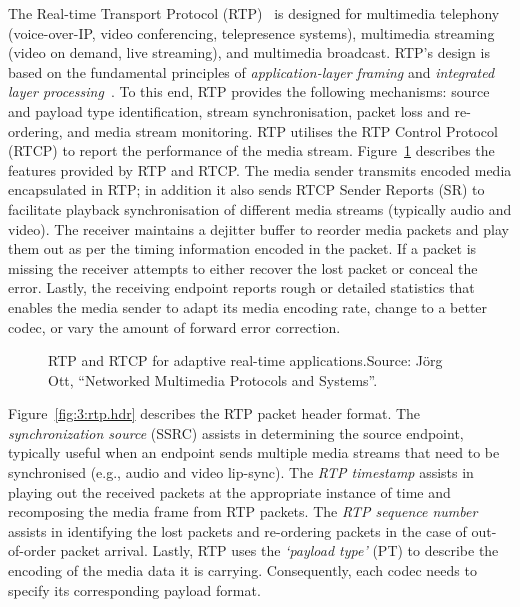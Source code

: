 
The Real-time Transport Protocol (RTP)~\cite{rfc3550} is designed for
multimedia telephony (voice-over-IP, video conferencing, telepresence
systems), multimedia streaming (video on demand, live streaming), and
multimedia broadcast. RTP's design is based on the fundamental principles of
\textit {application-layer framing} and \textit{integrated layer
processing}~\cite{clark:alf}. To this end, RTP provides the following
mechanisms: source and payload type identification, stream synchronisation,
packet loss and re-ordering, and media stream monitoring. RTP utilises the RTP
Control Protocol (RTCP) to report the performance of the media stream.
Figure~\ref{fig:3:rtp:model} describes the features provided by RTP and RTCP.
The media sender transmits encoded media encapsulated in RTP; in addition it
also sends RTCP Sender Reports (SR) to facilitate playback synchronisation of
different media streams (typically audio and video). The receiver maintains a
dejitter buffer to reorder media packets and play them out as per the timing
information encoded in the packet. If a packet is missing the receiver attempts
to either recover the lost packet or conceal the error. Lastly, the receiving
endpoint reports rough or detailed statistics that enables the media sender to
adapt its media encoding rate, change to a better codec, or vary the amount of
forward error correction.

\begin{figure}[!t]
\caption{RTP and RTCP for adaptive real-time applications.{\scriptsize Source:
J\"org Ott, ``Networked Multimedia Protocols and Systems''}.}
\label{fig:3:rtp:model}
\end{figure}

Figure~\ref{fig:3:rtp.hdr} describes the RTP packet header format. The
\textit{synchronization source} (SSRC) assists in determining the source
endpoint, typically useful when an endpoint sends multiple media streams that
need to be synchronised (e.g., audio and video lip-sync). The \textit{RTP
timestamp} assists in playing out the received packets at the appropriate
instance of time and recomposing the media frame from RTP packets. The
\textit{RTP sequence number} assists in identifying the lost packets and 
re-ordering packets in the case of out-of-order packet arrival. Lastly, RTP uses
the \textit{`payload type'} (PT) to describe the encoding of the media data it is
carrying. Consequently, each codec needs to specify its corresponding payload
format.

